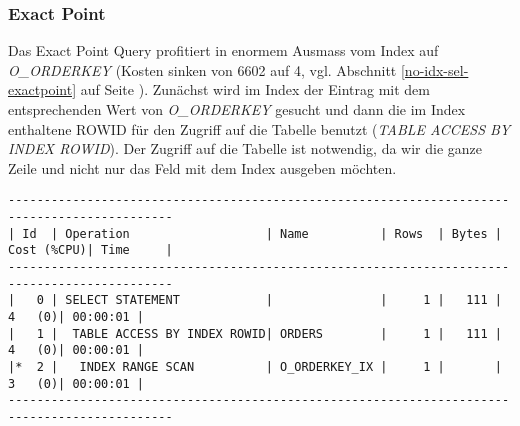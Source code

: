 \documentclass[11pt,a4paper,parskip=half]{scrartcl}
\begin{document}
\subsubsection{Exact Point}
Das Exact Point Query profitiert in enormem Ausmass vom Index auf \emph{O\_ORDERKEY} (Kosten sinken von 6602 auf 4, vgl. Abschnitt \ref{no-idx-sel-exactpoint} auf Seite \pageref{no-idx-sel-exactpoint}). Zunächst wird im Index der Eintrag mit dem entsprechenden Wert von \emph{O\_ORDERKEY} gesucht und dann die im Index enthaltene ROWID für den Zugriff auf die Tabelle benutzt (\emph{TABLE ACCESS BY INDEX ROWID}). Der Zugriff auf die Tabelle ist notwendig, da wir die ganze Zeile und nicht nur das Feld mit dem Index ausgeben möchten.
\begin{lstlisting}
---------------------------------------------------------------------------------------------                                                                                                                                                                                                                
| Id  | Operation                   | Name          | Rows  | Bytes | Cost (%CPU)| Time     |                                                                                                                                                                                                                
---------------------------------------------------------------------------------------------                                                                                                                                                                                                                
|   0 | SELECT STATEMENT            |               |     1 |   111 |     4   (0)| 00:00:01 |                                                                                                                                                                                                                
|   1 |  TABLE ACCESS BY INDEX ROWID| ORDERS        |     1 |   111 |     4   (0)| 00:00:01 |                                                                                                                                                                                                                
|*  2 |   INDEX RANGE SCAN          | O_ORDERKEY_IX |     1 |       |     3   (0)| 00:00:01 |                                                                                                                                                                                                                
---------------------------------------------------------------------------------------------                                                                                                                                                                                                                
                                                                                                                                                                                                                                                                                                             

\end{lstlisting}
\end{document}
